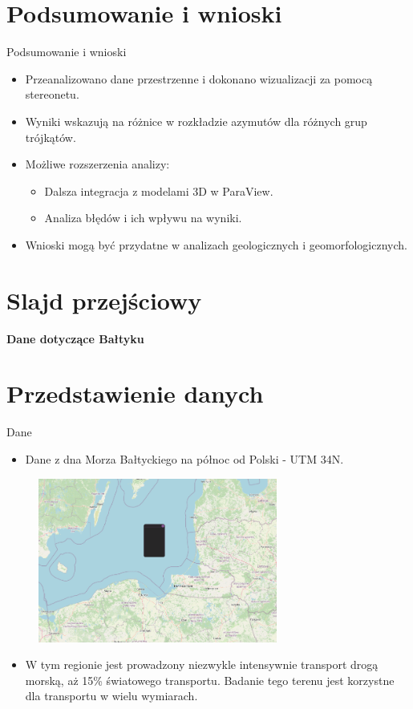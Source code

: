 \documentclass{beamer}
\begin{document}
\section{Podsumowanie i wnioski}
\begin{frame}{Podsumowanie i wnioski}
    \begin{itemize}
        \item Przeanalizowano dane przestrzenne i dokonano wizualizacji za pomocą stereonetu.
        \item Wyniki wskazują na różnice w rozkładzie azymutów dla różnych grup trójkątów.
        \item Możliwe rozszerzenia analizy:
        \begin{itemize}
            \item Dalsza integracja z modelami 3D w ParaView.
            \item Analiza błędów i ich wpływu na wyniki.
        \end{itemize}
        \item Wnioski mogą być przydatne w analizach geologicznych i geomorfologicznych.
    \end{itemize}
\end{frame}

\section{Slajd przejściowy}
\begin{frame}
	\centering
	{\Huge \textbf{Dane dotyczące Bałtyku}}
\end{frame}


\section{Przedstawienie danych}
\begin{frame}{Dane}
	\begin{itemize}
		\item Dane z dna Morza Bałtyckiego na północ od Polski - UTM 34N.
	\end{itemize}
	\begin{figure}
		\includegraphics[width=0.7\textwidth]{screen1.png}
	\end{figure}
	\begin{itemize}
		\item W tym regionie jest prowadzony niezwykle intensywnie transport drogą morską, aż 15\% światowego transportu. Badanie tego terenu jest korzystne dla transportu w wielu wymiarach.
	\end{itemize}
\end{frame}
\end{document}
